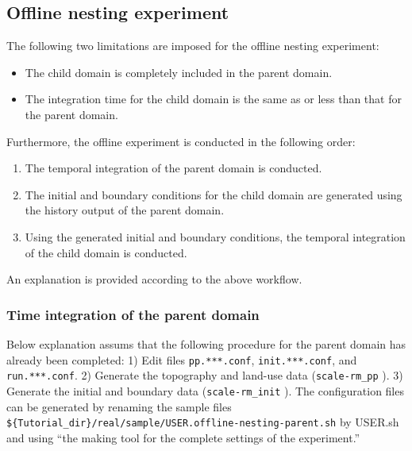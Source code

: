 \subsection{Offline nesting experiment} \label{subsec:nest_offline}

The following two limitations are imposed for the offline nesting experiment:
\begin{itemize}
 \item The child domain is completely included in the parent domain.
 \item The integration time for the child domain is the same as or less than that for the parent domain.
\end{itemize}
Furthermore, the offline experiment is conducted in the following order:
\begin{enumerate}
 \item The temporal integration of the parent domain is conducted.
 \item The initial and boundary conditions for the child domain are generated using the history output of the parent domain.
 \item Using the generated initial and boundary conditions, the temporal integration of the child domain is conducted.
\end{enumerate}
An explanation is provided according to the above workflow.


\subsubsection{Time integration of the parent domain}

Below explanation assums that the following procedure for the parent domain has already been completed:
1) Edit files \verb|pp.***.conf|, \verb|init.***.conf|, and \verb|run.***.conf|.
2) Generate the topography and land-use data (\verb|scale-rm_pp| ).
3) Generate the initial and boundary data (\verb|scale-rm_init| ).
The configuration files can be generated by renaming the sample files \\ \verb|${Tutorial_dir}/real/sample/USER.offline-nesting-parent.sh| by USER.sh and using ``the making tool for the complete settings of the experiment.''

